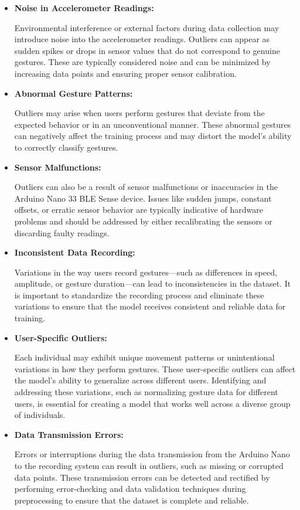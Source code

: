 \begin{itemize}
	
	\item \textbf{Noise in Accelerometer Readings:}
	
	Environmental interference or external factors during data collection may introduce noise into the accelerometer readings. Outliers can appear as sudden spikes or drops in sensor values that do not correspond to genuine gestures. These are typically considered noise and can be minimized by increasing data points and ensuring proper sensor calibration.
	
	\item \textbf{Abnormal Gesture Patterns:}
	
	Outliers may arise when users perform gestures that deviate from the expected behavior or in an unconventional manner. These abnormal gestures can negatively affect the training process and may distort the model's ability to correctly classify gestures.
	
	\item \textbf{Sensor Malfunctions:}
	
	Outliers can also be a result of sensor malfunctions or inaccuracies in the Arduino Nano 33 BLE Sense device. Issues like sudden jumps, constant offsets, or erratic sensor behavior are typically indicative of hardware problems and should be addressed by either recalibrating the sensors or discarding faulty readings.
	
	\item \textbf{Inconsistent Data Recording:}
	
	Variations in the way users record gestures—such as differences in speed, amplitude, or gesture duration—can lead to inconsistencies in the dataset. It is important to standardize the recording process and eliminate these variations to ensure that the model receives consistent and reliable data for training.
	
	\item \textbf{User-Specific Outliers:}
	
	Each individual may exhibit unique movement patterns or unintentional variations in how they perform gestures. These user-specific outliers can affect the model's ability to generalize across different users. Identifying and addressing these variations, such as normalizing gesture data for different users, is essential for creating a model that works well across a diverse group of individuals.
	
	\item \textbf{Data Transmission Errors:}
	
	Errors or interruptions during the data transmission from the Arduino Nano to the recording system can result in outliers, such as missing or corrupted data points. These transmission errors can be detected and rectified by performing error-checking and data validation techniques during preprocessing to ensure that the dataset is complete and reliable.
	
\end{itemize}

